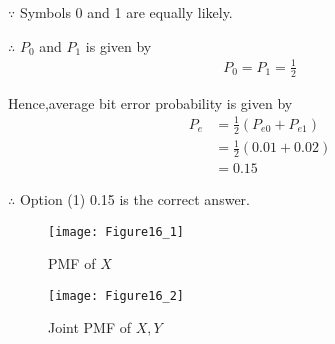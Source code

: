 \documentclass[journal,12pt,twocolumn]{IEEEtran}
\begin{document}
$\because$ Symbols 0 and 1 are equally likely.

$\therefore$ $P_0$ and $P_1$ is given by
\begin{align}
    P_0=P_1=\frac{1}{2}
\end{align}

Hence,average bit error probability is given by
\begin{align}
    P_e &=\frac{1}{2}(P_{e0}+P_{e1}) \\
    &= \frac{1}{2}(0.01+0.02) \\
    &= \boxed{0.15}
\end{align}

$\therefore$ Option (1) 0.15 is the correct answer.

\begin{figure}[!ht]
\centering
\texttt{[image: Figure16\_1]}
\caption{PMF of $X$}
\label{fig:pmf_x}	
\end{figure}

\begin{figure}[!ht]
\centering
\texttt{[image: Figure16\_2]}
\caption{Joint PMF of $X,Y$}
\label{fig:joint_pmf}	
\end{figure}
\end{document}
